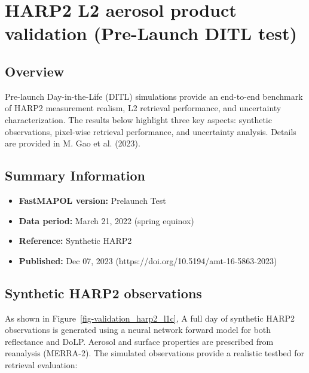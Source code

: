 \documentclass[
  letterpaper,
]{scrbook}
\providecommand{\tightlist}{%
  \setlength{\itemsep}{0pt}\setlength{\parskip}{0pt}}
\begin{document}

\chapter{HARP2 L2 aerosol product validation (Pre-Launch DITL
test)}\label{harp2-l2-aerosol-product-validation-pre-launch-ditl-test}

\section{Overview}\label{overview-1}

Pre-launch Day-in-the-Life (DITL) simulations provide an end-to-end
benchmark of HARP2 measurement realism, L2 retrieval performance, and
uncertainty characterization. The results below highlight three key
aspects: synthetic observations, pixel-wise retrieval performance, and
uncertainty analysis. Details are provided in M. Gao et al. (2023).

\section{Summary Information}\label{summary-information}

\begin{itemize}
\tightlist
\item
  \textbf{FastMAPOL version:} Prelaunch Test\\
\item
  \textbf{Data period:} March 21, 2022 (spring equinox)\\
\item
  \textbf{Reference:} Synthetic HARP2\\
\item
  \textbf{Published:} Dec 07, 2023
  (https://doi.org/10.5194/amt-16-5863-2023)
\end{itemize}

\section{Synthetic HARP2
observations}\label{synthetic-harp2-observations}

As shown in Figure~\ref{fig-validation_harp2_l1c}, A full day of
synthetic HARP2 observations is generated using a neural network forward
model for both reflectance and DoLP. Aerosol and surface properties are
prescribed from reanalysis (MERRA-2). The simulated observations provide
a realistic testbed for retrieval evaluation:
\end{document}

